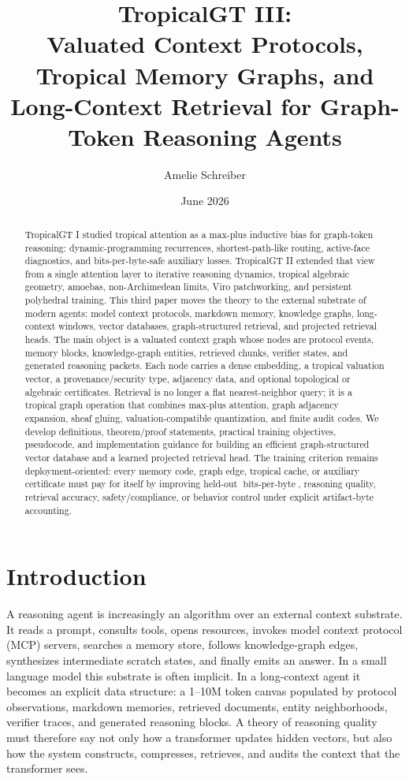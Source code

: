 \documentclass[11pt]{article}
\title{\bfseries TropicalGT III:\\ Valuated Context Protocols, Tropical Memory Graphs, and Long-Context Retrieval for Graph-Token Reasoning Agents}
\author{Amelie Schreiber}
\date{June 2026}
\theoremstyle{definition}
\theoremstyle{remark}
\newcommand{\bits}{\ensuremath{\operatorname{bits\text{-}per\text{-}byte}}}
\begin{document}
\maketitle

\begin{abstract}
TropicalGT I studied tropical attention as a max-plus inductive bias for graph-token reasoning: dynamic-programming recurrences, shortest-path-like routing, active-face diagnostics, and bits-per-byte-safe auxiliary losses. TropicalGT II extended that view from a single attention layer to iterative reasoning dynamics, tropical algebraic geometry, amoebas, non-Archimedean limits, Viro patchworking, and persistent polyhedral training. This third paper moves the theory to the external substrate of modern agents: model context protocols, markdown memory, knowledge graphs, long-context windows, vector databases, graph-structured retrieval, and projected retrieval heads. The main object is a valuated context graph whose nodes are protocol events, memory blocks, knowledge-graph entities, retrieved chunks, verifier states, and generated reasoning packets. Each node carries a dense embedding, a tropical valuation vector, a provenance/security type, adjacency data, and optional topological or algebraic certificates. Retrieval is no longer a flat nearest-neighbor query; it is a tropical graph operation that combines max-plus attention, graph adjacency expansion, sheaf gluing, valuation-compatible quantization, and finite audit codes. We develop definitions, theorem/proof statements, practical training objectives, pseudocode, and implementation guidance for building an efficient graph-structured vector database and a learned projected retrieval head. The training criterion remains deployment-oriented: every memory code, graph edge, tropical cache, or auxiliary certificate must pay for itself by improving held-out \bits, reasoning quality, retrieval accuracy, safety/compliance, or behavior control under explicit artifact-byte accounting.
\end{abstract}

\tableofcontents
\newpage

\section{Introduction}

A reasoning agent is increasingly an algorithm over an external context substrate. It reads a prompt, consults tools, opens resources, invokes model context protocol (MCP) servers, searches a memory store, follows knowledge-graph edges, synthesizes intermediate scratch states, and finally emits an answer. In a small language model this substrate is often implicit. In a long-context agent it becomes an explicit data structure: a 1--10M token canvas populated by protocol observations, markdown memories, retrieved documents, entity neighborhoods, verifier traces, and generated reasoning blocks. A theory of reasoning quality must therefore say not only how a transformer updates hidden vectors, but also how the system constructs, compresses, retrieves, and audits the context that the transformer sees.
\end{document}
